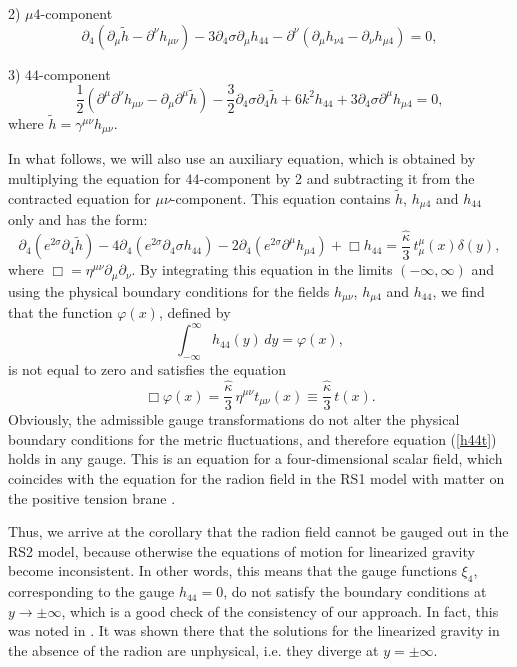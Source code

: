 \documentclass[a4paper,12pt]{article}
\begin{document}
 2) $\mu 4$-component
\begin{equation}\label{mu-4}
\partial_4 ( \partial_\mu \tilde h - \partial^\nu  h_{\mu\nu})-
3\partial_4 \sigma \partial_\mu h_{44} -
\partial^{\nu}\left(\partial_{\mu}h_{\nu 4}-\partial_{\nu}h_{\mu 4}\right)= 0,
\end{equation}

 3) $4 4$-component
\begin{equation}\label{4-4}
\frac{1}{2}(\partial^\mu \partial^\nu  h_{\mu\nu} - \partial_\mu
\partial^\mu \tilde h ) - \frac{3}{2}\partial_4 \sigma \partial_4 \tilde h
+ 6 k^2 h_{44} +3\partial_4\sigma\partial^{\mu}h_{\mu 4}=0,
\end{equation}
where $\tilde h=\gamma^{\mu\nu}h_{\mu\nu}$.

In what
follows, we will also use an auxiliary equation, which is obtained
by multiplying the equation for $44$-component by 2 and
subtracting it from the contracted equation for
$\mu\nu$-component. This equation contains $\tilde h$, $h_{\mu 4}$
and $h_{44}$ only and has the form:
\begin{equation}\label{contracted-44}
\partial_4\left(e^{2\sigma}\partial_4 \tilde h \right)
-4\partial_4\left(e^{2\sigma}\partial_4 \sigma
h_{44}\right)-2\partial_4(e^{2\sigma}\partial^{\mu}h_{\mu 4})+
\Box h_{44} = \frac{\hat \kappa}{3}\, t_{\mu}^{\mu}(x)\delta(y),
\end{equation}
where $\Box=\eta^{\mu\nu}\partial_{\mu}\partial_{\nu}$. By
integrating this equation in the limits $(-\infty,\infty)$ and
using the physical boundary conditions for the fields $h_{\mu\nu}$,
$h_{\mu 4}$ and $h_{44}$, we  find that the function $\varphi(x)$, defined by
\begin{equation}
\int_{-\infty}^\infty h_{44}(y)\, dy = \varphi(x),
\end{equation}
is not equal to zero and satisfies the equation
\begin{equation}\label{h44t}
\Box\varphi(x) = \frac{\hat
\kappa}{3}\, \eta^{\mu\nu}t_{\mu\nu}(x)\equiv\frac{\hat \kappa}{3}\,
t(x).
\end{equation}
Obviously, the admissible gauge transformations do not alter the physical boundary
conditions for the metric fluctuations, and therefore equation (\ref{h44t}) holds in any
gauge. This is an equation for a four-dimensional scalar field, which coincides with
the equation for the radion field in the RS1 model with matter on the positive tension
brane \cite{SV}.

Thus, we arrive at the corollary that the radion field  cannot be  gauged
out in the RS2 model, because otherwise the equations  of motion for
linearized gravity become inconsistent. In other words,  this means that
the gauge functions $\xi_4$, corresponding to the gauge $h_{44}= 0$, do not
satisfy the boundary conditions at $y\to\pm\infty$, which is a good check
of the  consistency of our approach. In fact, this was noted in
\cite{Kakushadze}. It was shown there that the solutions for the linearized
gravity in the absence of the radion are unphysical, i.e. they diverge at
$y=\pm\infty$.
\end{document}
